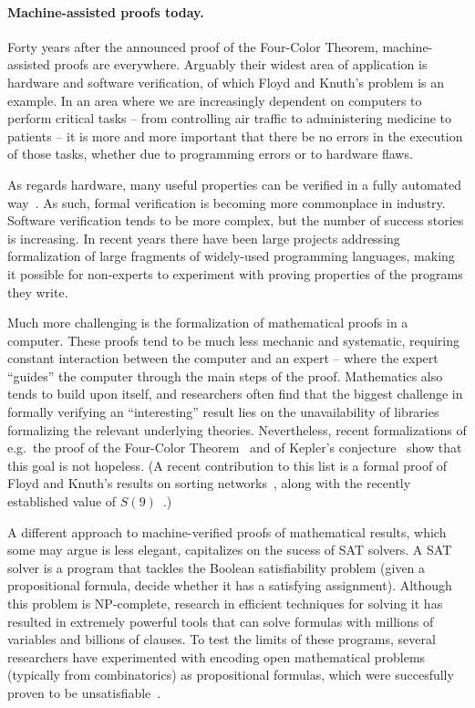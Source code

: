 \paragraph{Machine-assisted proofs today.}

Forty years after the announced proof of the Four-Color Theorem,
machine-assisted proofs are everywhere. Arguably their widest area of
application is hardware and software verification, of which Floyd and Knuth's
problem is an example. In an area where we are increasingly dependent on
computers to perform critical tasks -- from controlling air traffic to
administering medicine to patients -- it is more and more important that there
be no errors in the execution of those tasks, whether due to programming errors
or to hardware flaws.

As regards hardware, many useful properties can be verified in a fully automated
way~\cite{Kropf1999}. As such, formal verification is becoming more commonplace
in industry. Software verification tends to be more complex, but the number of
success stories is increasing. In recent years there have been large projects
addressing formalization of large fragments of widely-used programming
languages, making it possible for non-experts to experiment with proving
properties of the programs they write.

Much more challenging is the formalization of mathematical proofs in a
computer. These proofs tend to be much less mechanic and systematic, requiring
constant interaction between the computer and an expert -- where the expert
``guides'' the computer through the main steps of the proof. Mathematics also
tends to build upon itself, and researchers often find that the biggest
challenge in formally verifying an ``interesting'' result lies on the
unavailability of libraries formalizing the relevant underlying theories.
Nevertheless, recent formalizations of e.g.~the proof of the Four-Color
Theorem~\cite{Gonthier2008} and of Kepler's conjecture~\cite{Hales2014a} show
that this goal is not hopeless. (A recent contribution to this list is a formal
proof of Floyd and Knuth's results on sorting networks~\cite{lcfEtAl2017a},
along with the recently established value of $S(9)$~\cite{CodishEtAl2016}.)

A different approach to machine-verified proofs of mathematical results, which
some may argue is less elegant, capitalizes on the sucess of SAT solvers. A SAT
solver is a program that tackles the Boolean satisfiability problem (given a
propositional formula, decide whether it has a satisfying assignment). Although
this problem is NP-complete, research in efficient techniques for solving it has
resulted in extremely powerful tools that can solve formulas with millions of
variables and billions of clauses. To test the limits of these programs, several
researchers have experimented with encoding open mathematical problems
(typically from combinatorics) as propositional formulas, which were succesfully
proven to be unsatisfiable~\cite{HeuleKullmann2017}.


